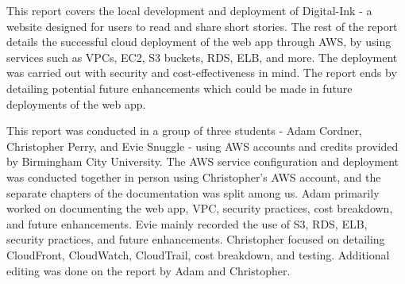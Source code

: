 \beforeabstract
{}

This report covers the local development and deployment of Digital-Ink - a website designed for users to read and share
short stories.
The rest of the report details the successful cloud deployment of the web app through AWS, by using services such as
VPCs, EC2, S3 buckets, RDS, ELB, and more.
The deployment was carried out with security and cost-effectiveness in mind.
The report ends by detailing potential future enhancements which could be made in future deployments of the web app.

This report was conducted in a group of three students - Adam Cordner, Christopher Perry, and Evie Snuggle - using
AWS accounts and credits provided by Birmingham City University.
The AWS service configuration and deployment was conducted together in person using Christopher's AWS account, and the
separate chapters of the documentation was split among us.
Adam primarily worked on documenting the web app, VPC, security practices, cost breakdown, and future enhancements.
Evie mainly recorded the use of S3, RDS, ELB, security practices, and future enhancements.
Christopher focused on detailing CloudFront, CloudWatch, CloudTrail, cost breakdown, and testing.
Additional editing was done on the report by Adam and Christopher.